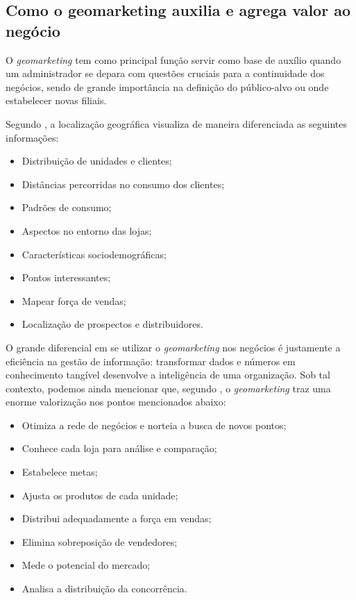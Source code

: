 \subsection{Como o geomarketing auxilia e agrega valor ao negócio}
\label{importancia}
O \emph{geomarketing} tem como principal função servir como base de auxílio quando um administrador se depara com questões cruciais para a continuidade dos negócios, sendo de grande importância na definição do público-alvo ou onde estabelecer novas filiais.

Segundo , a localização geográfica visualiza de maneira diferenciada as seguintes informações:

\begin{itemize}
  \item Distribuição de unidades e clientes;
  \item Distâncias percorridas no consumo dos clientes;
  \item Padrões de consumo;
  \item Aspectos no entorno das lojas;
  \item Características sociodemográficas;
  \item Pontos interessantes;
  \item Mapear força de vendas;
  \item Localização de prospectos e distribuidores.
\end{itemize}

O grande diferencial em se utilizar o \emph{geomarketing} nos negócios é justamente a eficiência na gestão de informação: transformar dados e números em conhecimento tangível desenvolve a inteligência de uma organização. Sob tal contexto, podemos ainda mencionar que, segundo  , o \emph{geomarketing} traz uma enorme valorização nos pontos mencionados abaixo:

\begin{itemize}
  \item Otimiza a rede de negócios e norteia a busca de novos pontos;
  \item Conhece cada loja para análise e comparação;
  \item Estabelece metas;
  \item Ajusta os produtos de cada unidade;
  \item Distribui adequadamente a força em vendas;
  \item Elimina sobreposição de vendedores;
  \item Mede o potencial do mercado;
  \item Analisa a distribuição da concorrência.
\end{itemize}

